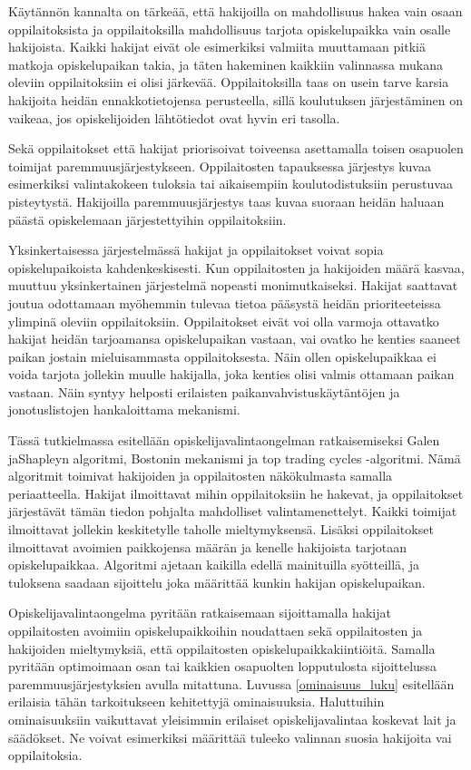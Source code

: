 \documentclass[twoside]{tktltiki}
\begin{document}
Käytännön kannalta on tärkeää, että hakijoilla on mahdollisuus hakea
vain osaan oppilaitoksista ja oppilaitoksilla mahdollisuus tarjota
opiskelupaikka vain osalle hakijoista. Kaikki hakijat eivät ole
esimerkiksi valmiita muuttamaan pitkiä matkoja opiskelupaikan takia,
ja täten hakeminen kaikkiin valinnassa mukana oleviin oppilaitoksiin
ei olisi järkevää. Oppilaitoksilla taas on usein tarve karsia
hakijoita heidän ennakkotietojensa perusteella, sillä koulutuksen
järjestäminen on vaikeaa, jos opiskelijoiden lähtötiedot ovat hyvin
eri tasolla.

Sekä oppilaitokset että hakijat priorisoivat toiveensa asettamalla
toisen osapuolen toimijat paremmuusjärjestykseen. Oppilaitosten
tapauksessa järjestys kuvaa esimerkiksi valintakokeen tuloksia tai
aikaisempiin koulutodistuksiin perustuvaa pisteytystä. Hakijoilla
paremmuusjärjestys taas kuvaa suoraan heidän haluaan päästä
opiskelemaan järjestettyihin oppilaitoksiin.

Yksinkertaisessa järjestelmässä hakijat ja oppilaitokset voivat sopia
opiskelupaikoista kahdenkeskisesti. Kun oppilaitosten ja hakijoiden
määrä kasvaa, muuttuu yksinkertainen järjestelmä nopeasti
monimutkaiseksi. Hakijat saattavat joutua odottamaan myöhemmin tulevaa
tietoa pääsystä heidän prioriteeteissa ylimpinä oleviin
oppilaitoksiin. Oppilaitokset eivät voi olla varmoja ottavatko hakijat
heidän tarjoamansa opiskelupaikan vastaan, vai ovatko he kenties
saaneet paikan jostain mieluisammasta oppilaitoksesta. Näin ollen
opiskelupaikkaa ei voida tarjota jollekin muulle hakijalla, joka
kenties olisi valmis ottamaan paikan vastaan. Näin syntyy helposti
erilaisten paikanvahvistuskäytäntöjen ja jonotuslistojen hankaloittama
mekanismi.

Tässä tutkielmassa esitellään opiskelijavalintaongelman
ratkaisemiseksi Galen ja\newline Shapleyn algoritmi, Bostonin
mekanismi ja top trading cycles -algoritmi. Nämä algoritmit toimivat
hakijoiden ja oppilaitosten näkökulmasta samalla periaatteella.
Hakijat ilmoittavat mihin oppilaitoksiin he hakevat, ja oppilaitokset
järjestävät tämän tiedon pohjalta mahdolliset valintamenettelyt.
Kaikki toimijat ilmoittavat jollekin keskitetylle taholle
mieltymyksensä. Lisäksi oppilaitokset ilmoittavat avoimien paikkojensa
määrän ja kenelle hakijoista tarjotaan opiskelupaikkaa. Algoritmi
ajetaan kaikilla edellä mainituilla syötteillä, ja tuloksena saadaan
sijoittelu joka määrittää kunkin hakijan opiskelupaikan.

Opiskelijavalintaongelma pyritään ratkaisemaan sijoittamalla hakijat
oppilaitosten avoimiin opiskelupaikkoihin noudattaen sekä
oppilaitosten ja hakijoiden mieltymyksiä, että oppilaitosten
opiskelupaikkakiintiöitä. Samalla pyritään optimoimaan osan tai
kaikkien osapuolten lopputulosta sijoittelussa paremmuusjärjestyksien
avulla mitattuna. Luvussa \ref{ominaisuus_luku} esitellään erilaisia
tähän tarkoitukseen kehitettyjä ominaisuuksia. Haluttuihin
ominaisuuksiin vaikuttavat yleisimmin erilaiset opiskelijavalintaa
koskevat lait ja säädökset. Ne voivat esimerkiksi määrittää tuleeko
valinnan suosia hakijoita vai oppilaitoksia.
\end{document}

